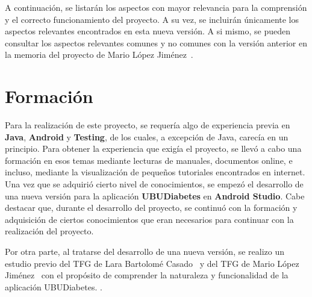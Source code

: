 A continuación, se listarán los aspectos con mayor relevancia para la comprensión y el correcto funcionamiento del proyecto. A su vez, se incluirán únicamente los aspectos relevantes encontrados en esta nueva versión.
A si mismo, se pueden consultar los aspectos relevantes comunes y no comunes con la versión anterior en la memoria del proyecto de Mario López Jiménez~\cite{mario2016}.
\section{Formación}
Para la realización de este proyecto, se requería algo de experiencia previa en \textbf{Java}, \textbf{Android} y \textbf{Testing}, de los cuales, a excepción de Java, carecía en un principio. Para obtener la experiencia que exigía el proyecto, se llevó a cabo una formación en esos temas mediante lecturas de manuales, documentos online, e incluso, mediante la visualización de pequeños tutoriales encontrados en internet. Una vez que se adquirió cierto nivel de conocimientos, se empezó el desarrollo de una nueva versión para la aplicación \textbf{UBUDiabetes} en \textbf{Android Studio}.
Cabe destacar que, durante el desarrollo del proyecto, se continuó con la formación y adquisición de ciertos conocimientos que eran necesarios para continuar con la realización del proyecto.

Por otra parte, al tratarse del desarrollo de una nueva versión, se realizo un estudio previo del TFG de Lara Bartolomé Casado~\cite{larab2015} y del TFG de Mario López Jiménez~\cite{mario2016} con el propósito de comprender la naturaleza y funcionalidad de la aplicación UBUDiabetes. .  

